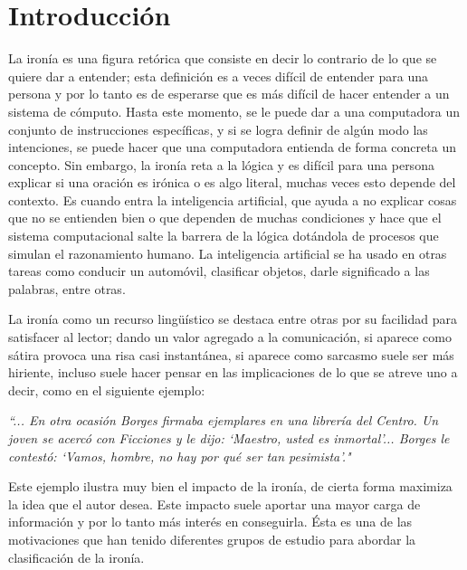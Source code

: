
\chapter{Introducción}\label{cap.introduccion}
\setcounter{page}{1}
\onehalfspacing

\par La ironía es una figura retórica que consiste en decir lo contrario de lo que se quiere dar a entender; esta definición es a veces difícil de entender para una persona y por lo tanto es de esperarse que es más difícil de hacer entender a un sistema de cómputo. Hasta este momento, se le puede dar a una computadora un conjunto de instrucciones específicas, y si se logra definir de algún modo las intenciones, se puede hacer que una computadora entienda de forma concreta un concepto. Sin embargo, la ironía reta a la lógica y es difícil para una persona explicar si una oración es irónica o es algo literal, muchas veces esto depende del contexto. Es cuando entra la inteligencia artificial, que ayuda a no explicar cosas que no se entienden bien o que dependen de muchas condiciones y hace que el sistema computacional salte la barrera de la lógica dotándola de procesos que simulan el razonamiento humano. La inteligencia artificial se ha usado en otras tareas como conducir un automóvil, clasificar objetos, darle significado a las palabras, entre otras.

\par La ironía como un recurso lingüístico se destaca entre otras por su facilidad para satisfacer al lector; dando un valor agregado a la comunicación, si aparece como sátira provoca una risa casi instantánea, si aparece como sarcasmo suele ser más hiriente, incluso suele hacer pensar en las implicaciones de lo que se atreve uno a decir, como en el siguiente ejemplo:

\begin{center}
	\textit{``... En otra ocasión Borges firmaba ejemplares en una librería del Centro. Un joven se acercó con Ficciones y le dijo: `Maestro, usted es inmortal'... Borges le contestó: `Vamos, hombre, no hay por qué ser tan pesimista'."} \textcite{Sergio2012}
	\vspace{5pt}
\end{center}
\vspace{5pt}

\par Este ejemplo ilustra muy bien el impacto de la ironía, de cierta forma maximiza la idea que el autor desea. Este impacto suele aportar una mayor carga de información y por lo tanto más interés en conseguirla. Ésta es una de las motivaciones que han tenido diferentes grupos de estudio para abordar la clasificación de la ironía.

